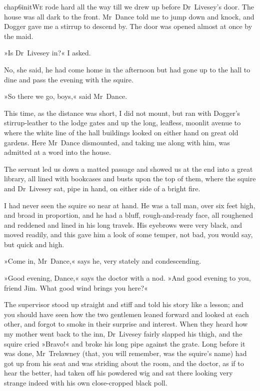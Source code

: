 

\lettrine[lines=5,image=true,findent=2pt]{chap6initW}{e} rode hard all the way till we drew up before Dr~Livesey's door. The house was all dark to the front. Mr~Dance told me to jump down and knock, and Dogger gave me a stirrup to descend by. The door was opened almost at once by the maid.

\zz
»Is Dr~Livesey in?« I asked.

No, she said, he had come home in the afternoon but had gone up to the hall to dine and pass the evening with the squire.

»So there we go, boys,« said Mr~Dance.

This time, as the distance was short, I did not mount, but ran with Dogger's stirrup-leather to the lodge gates and up the long, leafless, moonlit avenue to where the white line of the hall buildings looked on either hand on great old gardens. Here Mr~Dance dismounted, and taking me along with him, was admitted at a word into the house.

The servant led us down a matted passage and showed us at the end into a great library, all lined with bookcases and busts upon the top of them, where the squire and Dr~Livesey sat, pipe in hand, on either side of a bright fire.

I had never seen the squire so near at hand. He was a tall man, over six feet high, and broad in proportion, and he had a bluff, rough-and-ready face, all roughened and reddened and lined in his long travels. His eyebrows were very black, and moved readily, and this gave him a look of some temper, not bad, you would say, but quick and high.

»Come in, Mr~Dance,« says he, very stately and condescending.

»Good evening, Dance,« says the doctor with a nod. »And good evening to you, friend Jim. What good wind brings you here?«

The supervisor stood up straight and stiff and told his story like a lesson; and you should have seen how the two gentlemen leaned forward and looked at each other, and forgot to smoke in their surprise and interest. When they heard how my mother went back to the inn, Dr~Livesey fairly slapped his thigh, and the squire cried »Bravo!« and broke his long pipe against the grate. Long before it was done, Mr~Trelawney (that, you will remember, was the squire's name) had got up from his seat and was striding about the room, and the doctor, as if to hear the better, had taken off his powdered wig and sat there looking very strange indeed with his own close-cropped black poll.

